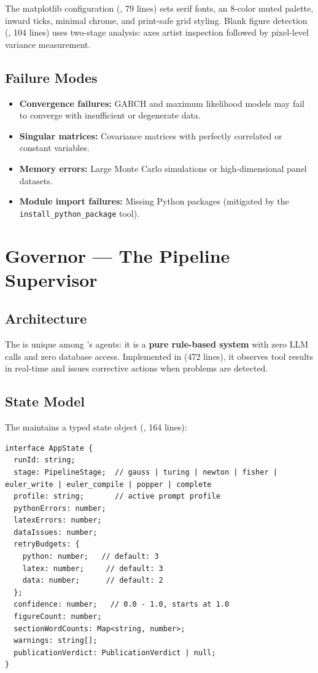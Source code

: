 The matplotlib configuration (, 79 lines) sets serif fonts, an 8-color muted palette, inward ticks, minimal chrome, and print-safe grid styling.
Blank figure detection (, 104 lines) uses two-stage analysis: axes artist inspection followed by pixel-level variance measurement.

\subsection{Failure Modes}

\begin{itemize}
  \item \textbf{Convergence failures:} GARCH and maximum likelihood models may fail to converge with insufficient or degenerate data.
  \item \textbf{Singular matrices:} Covariance matrices with perfectly correlated or constant variables.
  \item \textbf{Memory errors:} Large Monte Carlo simulations or high-dimensional panel datasets.
  \item \textbf{Module import failures:} Missing Python packages (mitigated by the \texttt{install\_python\_package} tool).
\end{itemize}

\section{Governor --- The Pipeline Supervisor}
\label{sec:agents:governor}

\subsection{Architecture}

The \governor is unique among \autoscholar's agents: it is a \textbf{pure rule-based system} with zero LLM calls and zero database access.
Implemented in  (472 lines), it observes tool results in real-time and issues corrective actions when problems are detected.

\subsection{State Model}

The \governor maintains a typed state object (, 164 lines):

\begin{lstlisting}[style=typescript, caption=Governor state model (simplified).]
interface AppState {
  runId: string;
  stage: PipelineStage;  // gauss | turing | newton | fisher | euler_write | euler_compile | popper | complete
  profile: string;       // active prompt profile
  pythonErrors: number;
  latexErrors: number;
  dataIssues: number;
  retryBudgets: {
    python: number;   // default: 3
    latex: number;     // default: 3
    data: number;      // default: 2
  };
  confidence: number;   // 0.0 - 1.0, starts at 1.0
  figureCount: number;
  sectionWordCounts: Map<string, number>;
  warnings: string[];
  publicationVerdict: PublicationVerdict | null;
}
\end{lstlisting}

